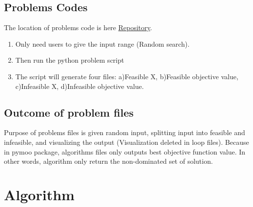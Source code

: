 \documentclass{article}
\begin{document}
\subsection{Problems Codes}
The location of problems code is here  \href{https://github.com/wuyoscar/MOOP/tree/master/Loopfiles/problems}{Repository}.
\begin{enumerate}
    \item Only need users to give the input range (Random search). 
    \item Then run the python problem script 
    \item The script will generate four files: a)Feasible X, b)Feasible objective value, c)Infeasible X, d)Infeasible objective value.
\end{enumerate}

\subsection{Outcome of problem files}
Purpose of problems files is given random input, splitting input into feasible and infeasible, and visualizing the output (Visualization deleted in loop files). Because in pymoo package, algorithms files only outputs best objective function value. 
In other words, algorithm only return the non-dominated set of solution.  

\section{Algorithm}
\end{document}
